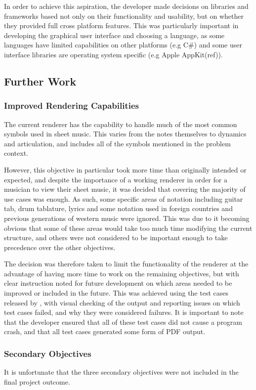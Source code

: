 In order to achieve this aspiration, the developer made decisions on libraries and frameworks based not only on their functionality and usability, but on whether they provided full cross platform features. This was particularly important in developing the graphical user interface and choosing a language, as some languages have limited capabilities on other platforms (e.g C\#) and some user interface libraries are operating system specific (e.g Apple AppKit(ref)).


\subsection{Further Work}
\subsubsection{Improved Rendering Capabilities}
The current renderer has the capability to handle much of the most common symbols used in sheet music. This varies from the notes themselves to dynamics and articulation, and includes all of the symbols mentioned in the problem context.

However, this objective in particular took more time than originally intended or expected, and despite the importance of a working renderer in order for a musician to view their sheet music, it was decided that covering the majority of use cases was enough. As such, some specific areas of notation including guitar tab, drum tablature, lyrics and some notation used in foreign countries and previous generations of western music were ignored. This was due to it becoming obvious that some of these areas would take too much time modifying the current structure, and others were not considered to be important enough to take precedence over the other objectives.

The decision was therefore taken to limit the functionality of the renderer at the advantage of having more time to work on the remaining objectives, but with clear instruction noted for future development on which areas needed to be improved or included in the future. This was achieved using the test cases released by \cite{Lilypond}, with visual checking of the output and reporting issues on which test cases failed, and why they were considered failures. It is important to note that the developer ensured that all of these test cases did not cause a program crash, and that all test cases generated some form of PDF output.

\subsubsection{Secondary Objectives}
It is unfortunate that the three secondary objectives were not included in the final project outcome. 


